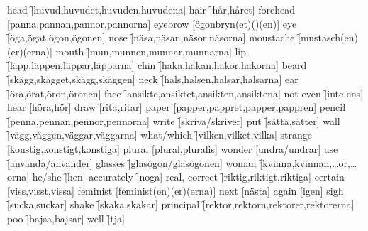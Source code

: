 \begin{questions}
    \begin{multicols}{2}
        \raggedcolumns
        \question head \f[huvud,huvudet,huvuden,huvudena]
        \question hair \f[hår,håret]
        \question forehead \f[panna,pannan,pannor,pannorna]
        \question eyebrow \f[ögonbryn(et)()(en)]
        \question eye \f[öga,ögat,ögon,ögonen]
        \question nose \f[näsa,näsan,näsor,näsorna]
        \question moustache \f[mustasch(en)(er)(erna)]
        \question mouth \f[mun,munnen,munnar,munnarna]
        \question lip \f[läpp,läppen,läppar,läpparna]
        \question chin \f[haka,hakan,hakor,hakorna]
        \question beard \f[skägg,skägget,skägg,skäggen]
        \question neck \f[hals,halsen,halsar,halsarna]
        \question ear \f[öra,örat,öron,öronen]
        \question face \f[ansikte,ansiktet,ansikten,ansiktena]
        \question not even \f[inte ens]
        \question hear \f[höra,hör]
        \question draw \f[rita,ritar]
        \question paper \f[papper,pappret,papper,pappren]
        \question pencil \f[penna,pennan,pennor,pennorna]
        \question write \f[skriva/skriver]
        \question put \f[sätta,sätter]
        \question wall \f[vägg,väggen,väggar,väggarna]
        \question what/which \f[vilken,vilket,vilka]
        \question strange \f[konstig,konstigt,konstiga]
        \question plural \f[plural,pluralis]
        \question wonder \f[undra/undrar]
        \question use \f[använda/använder]
        \question glasses \f[glasögon/glasögonen]
        \question woman \f[kvinna,kvinnan,\ldots or,\ldots orna]
        \question he/she \f[hen]
        \question accurately \f[noga]
        \question real, correct \f[riktig,riktigt,riktiga]
        \question certain \f[viss,visst,vissa]
        \question feminist \f[feminist(en)(er)(erna)]
        \question next \f[nästa]
        \question again \f[igen]
        \question sigh \f[sucka,suckar]
        \question shake \f[skaka,skakar]
        \question principal \f[rektor,rektorn,rektorer,rektorerna]
        \question poo \f[bajsa,bajsar]
        \question well \f[tja]
    \end{multicols}
\end{questions}
